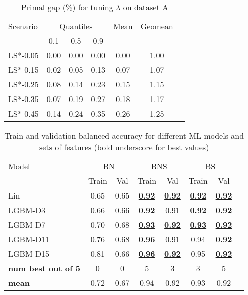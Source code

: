 \documentclass[3p, authoryear, times, doubleblind]{elsarticle}
\begin{document}
{%
 


\begin{table}[h]
\centering
\caption{Primal gap (\%) for tuning $\lambda$ on dataset A}
\label{tab:primal_gap_tune_A}
\begin{tabular}{lcccccc}
\toprule
{Scenario} & \multicolumn{3}{c}{Quantiles} & {Mean} & {Geomean} \\
{} & {0.1} & {0.5} & {0.9} & {} & {} \\
\midrule
LS*-0.05 & 0.00 & 0.00 & 0.00 & 0.00 & 1.00 \\
LS*-0.15 & 0.02 & 0.05 & 0.13 & 0.07 & 1.07 \\
LS*-0.25 & 0.08 & 0.14 & 0.23 & 0.15 & 1.15 \\
LS*-0.35 & 0.07 & 0.19 & 0.27 & 0.18 & 1.17 \\
LS*-0.45 & 0.14 & 0.24 & 0.35 & 0.26 & 1.25 \\
\bottomrule
\end{tabular}
\end{table}


\begin{table}[h]
\centering
\caption{Train and validation balanced accuracy for different ML models and sets of features (bold underscore for best values)}
\label{tab:ml_tune_two_cols}
\begin{tabular}{lccccccc}
\toprule
{Model} & \multicolumn{2}{c}{BN} & \multicolumn{2}{c}{BNS} & \multicolumn{2}{c}{BS} \\
{} & {Train} & {Val} & {Train} & {Val} & {Train} & {Val} \\
\midrule
Lin & 0.65 & 0.65 & \underline{\textbf{0.92}} & \underline{\textbf{0.92}} & \underline{\textbf{0.92}} & \underline{\textbf{0.92}} \\
LGBM-D3 & 0.66 & 0.66 & \underline{\textbf{0.92}} & 0.91 & \underline{\textbf{0.92}} & \underline{\textbf{0.92}} \\
LGBM-D7 & 0.70 & 0.68 & \underline{\textbf{0.93}} & \underline{\textbf{0.92}} & \underline{\textbf{0.93}} & \underline{\textbf{0.92}} \\
LGBM-D11 & 0.76 & 0.68 & \underline{\textbf{0.96}} & 0.91 & 0.94 & \underline{\textbf{0.92}} \\
LGBM-D15 & 0.81 & 0.66 & \underline{\textbf{0.96}} & \underline{\textbf{0.92}} & 0.95 & \underline{\textbf{0.92}} \\
\textbf{num best out of 5} & 0 & 0 & 5 & 3 & 3 & 5 \\
\textbf{mean} & 0.72 & 0.67 & 0.94 & 0.92 & 0.93 & 0.92 \\
\bottomrule
\end{tabular}
\end{table}


}
\end{document}
